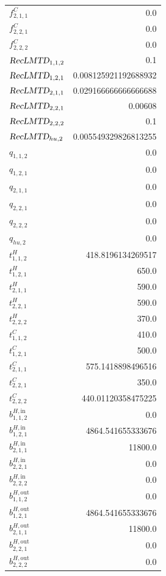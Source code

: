 \documentclass{article}%
\begin{document}
\begin{multicols*}{3}
\begin{supertabular}{lr}
	$f_{2,1,1}^{C}$ & 0.0 \\%
	$f_{2,2,1}^{C}$ & 0.0 \\%
	$f_{2,2,2}^{C}$ & 0.0 \\%
	$\textsl{RecLMTD}_{1,1,2}$ & 0.1 \\%
	$\textsl{RecLMTD}_{1,2,1}$ & 0.008125921192688932 \\%
	$\textsl{RecLMTD}_{2,1,1}$ & 0.029166666666666688 \\%
	$\textsl{RecLMTD}_{2,2,1}$ & 0.00608 \\%
	$\textsl{RecLMTD}_{2,2,2}$ & 0.1 \\%
	$\textsl{RecLMTD}_{hu,2}$ & 0.005549329826813255 \\%
	$q_{1,1,2}$ & 0.0 \\%
	$q_{1,2,1}$ & 0.0 \\%
	$q_{2,1,1}$ & 0.0 \\%
	$q_{2,2,1}$ & 0.0 \\%
	$q_{2,2,2}$ & 0.0 \\%
	$q_{hu,2}$ & 0.0 \\%
	$t_{1,1,2}^{H}$ & 418.8196134269517 \\%
	$t_{1,2,1}^{H}$ & 650.0 \\%
	$t_{2,1,1}^{H}$ & 590.0 \\%
	$t_{2,2,1}^{H}$ & 590.0 \\%
	$t_{2,2,2}^{H}$ & 370.0 \\%
	$t_{1,1,2}^{C}$ & 410.0 \\%
	$t_{1,2,1}^{C}$ & 500.0 \\%
	$t_{2,1,1}^{C}$ & 575.1418898496516 \\%
	$t_{2,2,1}^{C}$ & 350.0 \\%
	$t_{2,2,2}^{C}$ & 440.01120358475225 \\%
	$b_{1,1,2}^{H,\text{in}}$ & 0.0 \\%
	$b_{1,2,1}^{H,\text{in}}$ & 4864.541655333676 \\%
	$b_{2,1,1}^{H,\text{in}}$ & 11800.0 \\%
	$b_{2,2,1}^{H,\text{in}}$ & 0.0 \\%
	$b_{2,2,2}^{H,\text{in}}$ & 0.0 \\%
	$b_{1,1,2}^{H,\text{out}}$ & 0.0 \\%
	$b_{1,2,1}^{H,\text{out}}$ & 4864.541655333676 \\%
	$b_{2,1,1}^{H,\text{out}}$ & 11800.0 \\%
	$b_{2,2,1}^{H,\text{out}}$ & 0.0 \\%
	$b_{2,2,2}^{H,\text{out}}$ & 0.0 \\%

\end{supertabular}
\end{multicols*}
\end{document}
